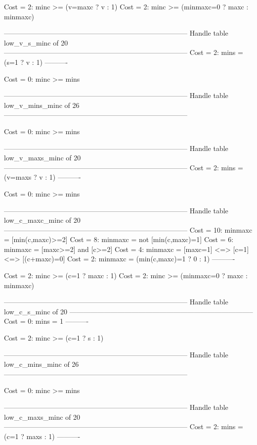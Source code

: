 Cost =  2:  minc >= (v=maxc ? v : 1)
Cost =  2:  minc >= (minmaxc=0 ? maxc : minmaxc)

--------------------------------------------------------------------------------
Handle table low_v_s_minc of 20
--------------------------------------------------------------------------------
Cost =  2:  mins = (s=1 ? v : 1)
----------

Cost =  0:  minc >= mins

--------------------------------------------------------------------------------
Handle table low_v_mins_minc of 26
--------------------------------------------------------------------------------

Cost =  0:  minc >= mins

--------------------------------------------------------------------------------
Handle table low_v_maxs_minc of 20
--------------------------------------------------------------------------------
Cost =  2:  mins = (v=maxs ? v : 1)
----------

Cost =  0:  minc >= mins

--------------------------------------------------------------------------------
Handle table low_c_maxc_minc of 20
--------------------------------------------------------------------------------
Cost = 10:  minmaxc = [min(c,maxc)>=2]
Cost =  8:  minmaxc = not [min(c,maxc)=1]
Cost =  6:  minmaxc = [maxc>=2] and [c>=2]
Cost =  4:  minmaxc = [maxc=1] <=> [c=1] <=> [(c+maxc)=0]
Cost =  2:  minmaxc = (min(c,maxc)=1 ? 0 : 1)
----------

Cost =  2:  minc >= (c=1 ? maxc : 1)
Cost =  2:  minc >= (minmaxc=0 ? maxc : minmaxc)

--------------------------------------------------------------------------------
Handle table low_c_s_minc of 20
--------------------------------------------------------------------------------
Cost =  0:  mins = 1
----------

Cost =  2:  minc >= (c=1 ? s : 1)

--------------------------------------------------------------------------------
Handle table low_c_mins_minc of 26
--------------------------------------------------------------------------------

Cost =  0:  minc >= mins

--------------------------------------------------------------------------------
Handle table low_c_maxs_minc of 20
--------------------------------------------------------------------------------
Cost =  2:  mins = (c=1 ? maxs : 1)
----------

